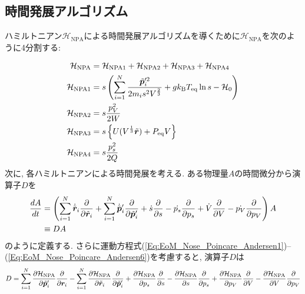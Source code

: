\subsection{時間発展アルゴリズム}

ハミルトニアン$\mathcal{H}_{\mathrm{NPA}}$による時間発展アルゴリズムを導くために$\mathcal{H}_{\mathrm{NPA}}$を次のように4分割する:

\begin{alignat}{3}
  \mathcal{H}_{\mathrm{NPA}}
  &=
  \mathcal{H}_{\mathrm{NPA1}} +
  \mathcal{H}_{\mathrm{NPA2}} +
  \mathcal{H}_{\mathrm{NPA3}} +
  \mathcal{H}_{\mathrm{NPA4}}
  \\
  \mathcal{H}_{\mathrm{NPA1}}
  &=
  s
  \left(
    \sum_{i=1}^{N}
    \frac{\Tilde{\bm{p}}_{i}^{\prime 2}}{2m_{i}s^{2}V^{\frac{2}{3}}}
    +
    g k_{\mathrm{B}} T_{\mathrm{eq}} \ln s
    -
    \mathcal{H}_{0}
  \right)
  \\
  \mathcal{H}_{\mathrm{NPA2}}
  &=
  s
  \frac{p_{V}^{2}}{2W}
  \\
  \mathcal{H}_{\mathrm{NPA3}}
  &=
  s
  \left\{
    U(V^{\frac{1}{3}} \Tilde{\bm{r}})
    +
    P_{\mathrm{eq}} V
  \right\}
  \\
  \mathcal{H}_{\mathrm{NPA4}}
  &=
  s
  \frac{p_{s}^{2}}{2Q}
\end{alignat}
次に, 各ハミルトニアンによる時間発展を考える.
ある物理量$A$の時間微分から演算子$D$を
\begin{align}
  \frac{dA}{dt}
  &=
  \left(
    \sum_{i=1}^{N} \dot{\Tilde{\bm{r}}}_{i}
    \frac{\partial}{\partial \Tilde{\bm{r}}_{i}}
    +
    \sum_{i=1}^{N} \dot{\Tilde{\bm{p}}}_{i}^{\prime}
    \frac{\partial}{\partial \Tilde{\bm{p}}_{i}^{\prime}}
    +
    \dot{s}
    \frac{\partial}{\partial s}
    -
    \dot{p_{s}}
    \frac{\partial}{\partial p_{s}}
    +
    \dot{V}
    \frac{\partial}{\partial V}
    -
    \dot{p_{V}}
    \frac{\partial}{\partial p_{V}}
  \right)
  A
  \\
  &\equiv
  DA
\end{align}
のように定義する. さらに運動方程式(\ref{Eq:EoM_Nose_Poincare_Andersen1})--(\ref{Eq:EoM_Nose_Poincare_Andersen6})を考慮すると, 演算子$D$は
\begin{align}
  D =
  \sum_{i=1}^{N}
  \frac{\partial \mathcal{H}_{\mathrm{NPA}}}{\partial \Tilde{\bm{p}}_{i}^{\prime}}
  \frac{\partial}{\partial \bm{r}_{i}}
  -
  \sum_{i=1}^{N}
  \frac{\partial \mathcal{H}_{\mathrm{NPA}}}{\partial \Tilde{\bm{r}}_{i}}
  \frac{\partial}{\partial \Tilde{\bm{p}}_{i}^{\prime}}
  +
  \frac{\partial \mathcal{H}_{\mathrm{NPA}}}{\partial p_{s}}
  \frac{\partial}{\partial s}
  -
  \frac{\partial \mathcal{H}_{\mathrm{NPA}}}{\partial s}
  \frac{\partial}{\partial p_{s}}
  +
  \frac{\partial \mathcal{H}_{\mathrm{NPA}}}{\partial p_{V}}
  \frac{\partial}{\partial V}
  -
  \frac{\partial \mathcal{H}_{\mathrm{NPA}}}{\partial V}
  \frac{\partial}{\partial p_{V}}
\end{align}
